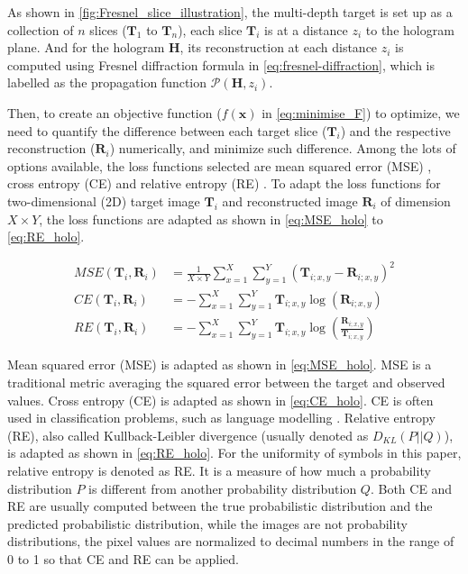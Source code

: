 As shown in \cref{fig:Fresnel_slice_illustration}, the multi-depth target is set up as a collection of $n$ slices ($\textbf{T}_1$ to $\textbf{T}_n$), each slice $\textbf{T}_i$ is at a distance $z_i$ to the hologram plane. And for the hologram $\textbf{H}$, its reconstruction at each distance $z_i$ is computed using Fresnel diffraction formula in \cref{eq:fresnel-diffraction}, which is labelled as the propagation function $\mathcal{P}(\textbf{H}, z_i)$.

Then, to create an objective function ($f(\textbf{x})$ in \cref{eq:minimise_F}) to optimize, we need to quantify the difference between each target slice ($\textbf{T}_i$) and the respective reconstruction ($\textbf{R}_i$) numerically, and minimize such difference. Among the lots of options available, the loss functions selected are mean squared error (MSE) \cite{MSE_REF}, cross entropy (CE) \cite{cybenko1998mathematics} and relative entropy (RE) \cite{Kullback1951}. To adapt the loss functions for two-dimensional (2D) target image $\textbf{T}_i$ and reconstructed image $\textbf{R}_i$ of dimension $X\times Y$, the loss functions are adapted as shown in \cref{eq:MSE_holo} to \cref{eq:RE_holo}.

\begin{align}
	MSE(\textbf{T}_i, \textbf{R}_i) & = \frac{1}{X\times Y} \sum_{x=1}^{X} \sum_{y=1}^{Y} (\textbf{T}_{i;x,y}-\textbf{R}_{i;x,y})^2\label{eq:MSE_holo}                     \\
	CE(\textbf{T}_i, \textbf{R}_i)  & = -\sum_{x=1}^{X} \sum_{y=1}^{Y} \textbf{T}_{i;x,y}\log(\textbf{R}_{i;x,y})\label{eq:CE_holo}                                        \\
	RE(\textbf{T}_i, \textbf{R}_i)  & = -\sum_{x=1}^{X} \sum_{y=1}^{Y} \textbf{T}_{i;x,y}\log\left(\frac{\textbf{R}_{i;x,y}}{\textbf{T}_{i;x,y}}\right) \label{eq:RE_holo}
\end{align}

Mean squared error (MSE) is adapted as shown in \cref{eq:MSE_holo}. MSE is a traditional metric averaging the squared error between the target and observed values. Cross entropy (CE) is adapted as shown in \cref{eq:CE_holo}. CE is often used in classification problems, such as language modelling \cite{Liu2018}. Relative entropy (RE), also called Kullback-Leibler divergence (usually denoted as $D_{KL}(P\vert\vert Q)$), is adapted as shown in \cref{eq:RE_holo}. For the uniformity of symbols in this paper, relative entropy is denoted as RE. It is a measure of how much a probability distribution $P$ is different from another probability distribution $Q$. Both CE and RE are usually computed between the true probabilistic distribution and the predicted probabilistic distribution, while the images are not probability distributions, the pixel values are normalized to decimal numbers in the range of 0 to 1 so that CE and RE can be applied.

